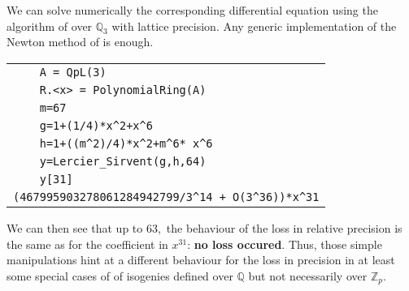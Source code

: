 \documentclass[sigconf]{acmart}
\theoremstyle{definition}
\begin{document}
We can solve numerically 
the corresponding differential equation
using the algorithm of \cite{Lercier-Sirvent:08}
over $\mathbb{Q}_3$ with lattice precision.
Any generic implementation of the Newton
method of \cite{Lercier-Sirvent:08} is enough.

\begin{tabular}{|l|}
\verb?    A = QpL(3)? \\
\verb?    R.<x> = PolynomialRing(A)?\\
\verb?    m=67?\\
\verb?    g=1+(1/4)*x^2+x^6?\\
\verb?    h=1+((m^2)/4)*x^2+m^6* x^6?\\
\verb?    y=Lercier_Sirvent(g,h,64)?\\
\verb?    y[31]?\\
\verb?(467995903278061284942799/3^14 + O(3^36))*x^31?\\
\end{tabular}

We can then see that up to $63,$ the behaviour
of the loss in relative precision is the same
as for the coefficient in $x^{31}$: \textbf{no loss
occured}.
Thus, those simple manipulations
hint at a different behaviour for the loss 
in precision in at least some special cases of
of isogenies defined over $\mathbb{Q}$
but not necessarily over $\mathbb{Z}_p.$ 



\end{document}
